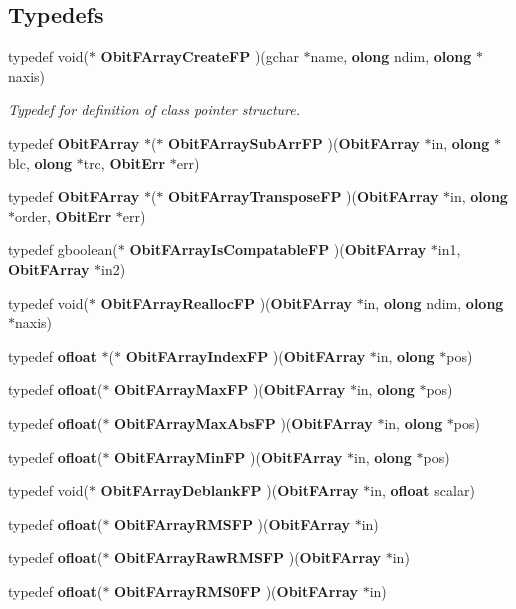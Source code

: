 \subsection*{Typedefs}
\begin{CompactItemize}
\item 
typedef void($\ast$ {\bf Obit\-FArray\-Create\-FP} )(gchar $\ast$name, {\bf olong} ndim, {\bf olong} $\ast$naxis)
\begin{CompactList}\small\item\em Typedef for definition of class pointer structure. \item\end{CompactList}\item 
typedef {\bf Obit\-FArray} $\ast$($\ast$ {\bf Obit\-FArray\-Sub\-Arr\-FP} )({\bf Obit\-FArray} $\ast$in, {\bf olong} $\ast$blc, {\bf olong} $\ast$trc, {\bf Obit\-Err} $\ast$err)
\item 
typedef {\bf Obit\-FArray} $\ast$($\ast$ {\bf Obit\-FArray\-Transpose\-FP} )({\bf Obit\-FArray} $\ast$in, {\bf olong} $\ast$order, {\bf Obit\-Err} $\ast$err)
\item 
typedef gboolean($\ast$ {\bf Obit\-FArray\-Is\-Compatable\-FP} )({\bf Obit\-FArray} $\ast$in1, {\bf Obit\-FArray} $\ast$in2)
\item 
typedef void($\ast$ {\bf Obit\-FArray\-Realloc\-FP} )({\bf Obit\-FArray} $\ast$in, {\bf olong} ndim, {\bf olong} $\ast$naxis)
\item 
typedef {\bf ofloat} $\ast$($\ast$ {\bf Obit\-FArray\-Index\-FP} )({\bf Obit\-FArray} $\ast$in, {\bf olong} $\ast$pos)
\item 
typedef {\bf ofloat}($\ast$ {\bf Obit\-FArray\-Max\-FP} )({\bf Obit\-FArray} $\ast$in, {\bf olong} $\ast$pos)
\item 
typedef {\bf ofloat}($\ast$ {\bf Obit\-FArray\-Max\-Abs\-FP} )({\bf Obit\-FArray} $\ast$in, {\bf olong} $\ast$pos)
\item 
typedef {\bf ofloat}($\ast$ {\bf Obit\-FArray\-Min\-FP} )({\bf Obit\-FArray} $\ast$in, {\bf olong} $\ast$pos)
\item 
typedef void($\ast$ {\bf Obit\-FArray\-Deblank\-FP} )({\bf Obit\-FArray} $\ast$in, {\bf ofloat} scalar)
\item 
typedef {\bf ofloat}($\ast$ {\bf Obit\-FArray\-RMSFP} )({\bf Obit\-FArray} $\ast$in)
\item 
typedef {\bf ofloat}($\ast$ {\bf Obit\-FArray\-Raw\-RMSFP} )({\bf Obit\-FArray} $\ast$in)
\item 
typedef {\bf ofloat}($\ast$ {\bf Obit\-FArray\-RMS0FP} )({\bf Obit\-FArray} $\ast$in)

\end{CompactItemize}
